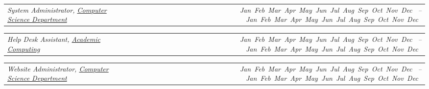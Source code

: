 \documentclass[9pt,letterpaper]{extarticle}
\makeatletter
\newcommand{\headerrow}[2]
{\begin{tabular*}{\linewidth}{l@{\extracolsep{\fill}}r}
	#1 &
	#2 \\
\end{tabular*}}
\newcommand{\DatestampYM}[2]{\mbox{\ShortMonth{#2} #1}}
\newcommand{\ShortMonth}[1]{%
\ifcase#1\relax
\or Jan%
\or Feb%
\or Mar%
\or Apr%
\or May%
\or Jun%
\or Jul%
\or Aug%
\or Sep%
\or Oct%
\or Nov%
\or Dec%
\fi}
\makeatother
\begin{document}
\begin{itemize}
	\headerrow
		{\emph{System Administrator, \href{http://cs.rocky.edu}{Computer Science Department}}}
		{\emph{\DatestampYM{2012}{03} -- \DatestampYM{2014}{05}}}
	\headerrow
		{\emph{Help Desk Assistant, \href{https://www.rocky.edu/resources/offices-departments/academic-computing}{Academic Computing}}}
		{\emph{\DatestampYM{2011}{09} -- \DatestampYM{2013}{05}}}
	\headerrow
		{\emph{Website Administrator, \href{http://cs.rocky.edu/programming-competitions/high-school-competions/}{Computer Science Department}}}
		{\emph{\DatestampYM{2010}{09} -- \DatestampYM{2011}{05}}}
\end{itemize}
\end{document}
